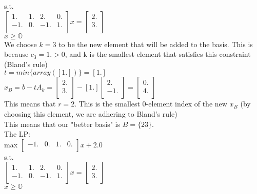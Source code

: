 \documentclass{article}
\begin{document}
s.t. \\
$\begin{bmatrix}
  1. & 1. & 2. & 0.\\
  -1. & 0. & -1. & 1.\\
\end{bmatrix}x = \begin{bmatrix}
  2.\\
  3.\\
\end{bmatrix}$\\
$x \geq\mathbb{O}$ \\

We choose $k = 3$ to be the new element that will be added to the basis. This is because $c_3 = 1. > 0$, and k is the smallest element that satisfies this constraint (Bland's rule)\\

$t = min\{array([1.])\} = [1.]$ \\

$x_B = b - tA_k = \begin{bmatrix}
  2.\\
  3.\\
\end{bmatrix} - [1.]\begin{bmatrix}
  2.\\
  -1.\\
\end{bmatrix} = \begin{bmatrix}
  0.\\
  4.\\
\end{bmatrix}$ \\

This means that $r = 2$. This is the smallest 0-element index of the new $x_B$ (by choosing this element, we are adhering to Bland's rule)\\

This means that our "better basis" is $B = \{2 3\}$. \\

The LP: \\
 max $\begin{bmatrix}
  -1. & 0. & 1. & 0.\\
\end{bmatrix}x + 2.0$ \\

s.t. \\
$\begin{bmatrix}
  1. & 1. & 2. & 0.\\
  -1. & 0. & -1. & 1.\\
\end{bmatrix}x = \begin{bmatrix}
  2.\\
  3.\\
\end{bmatrix}$\\
$x \geq\mathbb{O}$ \\
\end{document}
